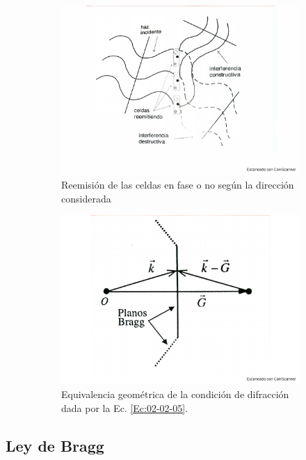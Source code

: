 \begin{figure}[h!]\centering
\begin{subfigure}{0.43\linewidth} \centering
	\includegraphics[scale=0.25]{Cuerpo/Ch_02/Fotos_libro 4.pdf}
	\caption{Reemisión de las celdas en fase o no según la dirección considerada}
	\label{Fig:02-04}
\end{subfigure}
\begin{subfigure}{0.43\linewidth} \centering
    \includegraphics[scale=0.24]{Cuerpo/Ch_02/Fotos_libro 5.pdf}
    \caption{Equivalencia geométrica de la condición de difracción dada por la Ec. \ref{Ec:02-02-05}.}
    \label{Fig:02-05}
\end{subfigure}
\caption{}
\end{figure}

\subsection{Ley de Bragg}

